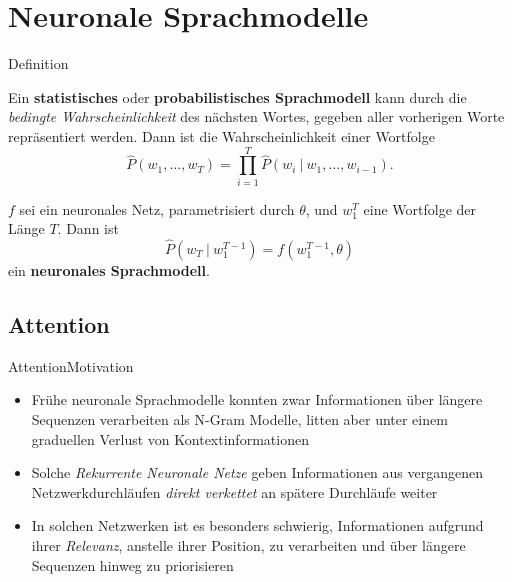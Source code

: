 \documentclass[aspectratio=169,10pt]{beamer}
\begin{document}
\section{Neuronale Sprachmodelle}

\begin{frame}{Definition}
    \setcounter{section}{2}
    \begin{definition} \footnotesize
        Ein \textbf{statistisches} oder \textbf{probabilistisches Sprachmodell} kann durch die \emph{bedingte Wahrscheinlichkeit} des nächsten Wortes, gegeben aller vorherigen Worte repräsentiert werden. Dann ist die Wahrscheinlichkeit einer Wortfolge
        \begin{equation*}
            \hat{P}(w_1, \dots, w_T)=\prod_{i=1}^{T}\hat{P}(w_i~\vert~w_1,\dots,w_{i-1}).
        \end{equation*}
    \end{definition}
    \vspace{-8 pt}

    \setcounter{section}{4}
    \setcounter{theorem}{0}
    \begin{definition} \footnotesize
        $f$ sei ein neuronales Netz, parametrisiert durch $\theta$, und $w_1^T$ eine Wortfolge der Länge $T$. Dann ist
        \begin{equation*}
            \hat{P}(w_T~\vert~w_1^{T-1})=f(w_1^{T-1},\theta)
        \end{equation*}
        ein \textbf{neuronales Sprachmodell}.
    \end{definition}
\end{frame}

\subsection{Attention}

\begin{frame}{Attention}{Motivation}
    \begin{itemize}
        \item Frühe neuronale Sprachmodelle konnten zwar Informationen über längere Sequenzen verarbeiten als N-Gram Modelle, litten aber unter einem graduellen Verlust von Kontextinformationen
        \item Solche \emph{Rekurrente Neuronale Netze} geben Informationen aus vergangenen Netzwerkdurchläufen \emph{direkt verkettet} an spätere Durchläufe weiter
        \item In solchen Netzwerken ist es besonders schwierig, Informationen aufgrund ihrer \emph{Relevanz}, anstelle ihrer Position, zu verarbeiten und über längere Sequenzen hinweg zu priorisieren
    \end{itemize}
\end{frame}
\end{document}
